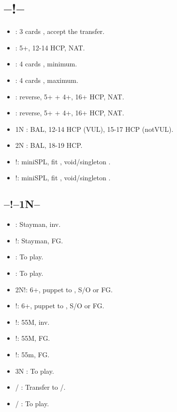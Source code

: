 \documentclass[12pt,twoside,a5paper]{report}%
\begin{document}
	\section*{--!--}
	\begin{itemize}
	\renewcommand{\labelitemi}{}
	\item {} : 3 cards \sp{}, accept the transfer.
	\item {} : 5+\cl{}, 12-14 HCP, NAT.
	\item {} : 4 cards \sp{}, minimum.
	\item {} : 4 cards \sp{}, maximum.
	\item {} :  reverse, 5+\cl{} + 4+\di{}, 16+ HCP, NAT.
	\item {} :  reverse, 5+\cl{} + 4+\he{}, 16+ HCP, NAT.
	\item 1N : BAL, 12-14 HCP (VUL), 15-17 HCP (notVUL).
	\item 2N : BAL, 18-19 HCP.	
	\item {}!: miniSPL, fit \sp{}, void/singleton \di{}.
	\item {}!: miniSPL, fit \sp{}, void/singleton \he{}.
	\end{itemize}

	\subsection*{--!--1N--}
	\begin{itemize}
	\renewcommand{\labelitemi}{}
	\item {} : Stayman, inv.
	\item {}!: Stayman, FG.
	\item {} : To play.
	\item {} : To play.
	\item 2N!: 6+\cl{}, puppet to , S/O or FG.
	\item {}!: 6+\di{}, puppet to , S/O or FG.
	\item {}!: 55M, inv.
	\item {}!: 55M, FG.
	\item {}!: 55m, FG.
	\item 3N : To play.
	\item {}/ : Transfer to /\sp{}.
	\item {}/ : To play.
	\end{itemize}
\end{document}

